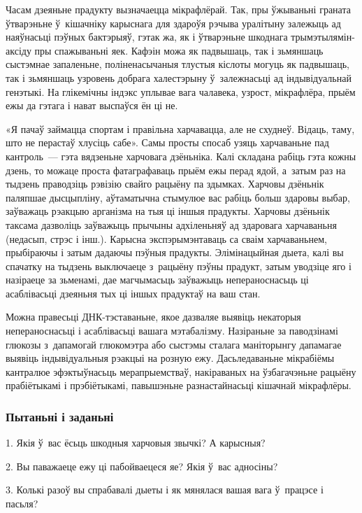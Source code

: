 Часам дзеяньне прадукту вызначаецца мікрафлёрай. Так, пры ўжываньні граната ўтварэньне ў~кішачніку карыснага для здароўя рэчыва уралітыну залежыць ад наяўнасьці пэўных бактэрыяў, гэтак жа, як і ўтварэньне шкоднага трымэтылямін-аксіду пры спажываньні яек. Кафэін можа як падвышаць, так і зьмяншаць сыстэмнае запаленьне, поліненасычаныя тлустыя кіслоты могуць як падвышаць, так і зьмяншаць узровень добрага халестэрыну ў~залежнасьці ад індывідуальнай генэтыкі. На глікемічны індэкс уплывае вага чалавека, узрост, мікрафлёра, прыём ежы да гэтага і нават выспаўся ён ці не.

«Я пачаў займацца спортам і правільна харчавацца, але не схуднеў. Відаць, таму, што не перастаў хлусіць сабе». Самы просты спосаб узяць харчаваньне пад кантроль~--- гэта вядзеньне харчовага дзёньніка. Калі складана рабіць гэта кожны дзень, то можаце проста фатаграфаваць прыём ежы перад ядой, а~затым раз на тыдзень праводзіць рэвізію свайго рацыёну па здымках. Харчовы дзёньнік паляпшае дысцыпліну, аўтаматычна стымулюе вас рабіць больш здаровы выбар, заўважаць рэакцыю арганізма на тыя ці іншыя прадукты. Харчовы дзёньнік таксама дазволіць заўважыць прычыны адхіленьняў ад здаровага харчаваньня (недасып, стрэс і інш.). Карысна экспэрымэнтаваць са сваім харчаваньнем, прыбіраючы і затым дадаючы пэўныя прадукты. Элімінацыйная дыета, калі вы спачатку на тыдзень выключаеце з~рацыёну пэўны прадукт, затым уводзіце яго і назіраеце за зьменамі, дае магчымасьць заўважыць непераноснасьць ці асаблівасьці дзеяньня тых ці іншых прадуктаў на ваш стан.

Можна правесьці ДНК-тэставаньне, якое дазваляе выявіць некаторыя непераноснасьці і асаблівасьці вашага мэтабалізму. Назіраньне за паводзінамі глюкозы з~дапамогай глюкомэтра або сыстэмы сталага маніторынгу дапамагае выявіць індывідуальныя рэакцыі на розную ежу. Дасьледаваньне мікрабіёмы кантралюе эфэктыўнасьць мерапрыемстваў, накіраваных на ўзбагачэньне рацыёну прабіётыкамі і прэбіётыкамі, павышэньне разнастайнасьці кішачнай мікрафлёры.

\subsubsection{Пытаньні і заданьні}

1. Якія ў~вас ёсьць шкодныя харчовыя звычкі? А карысныя?

2. Вы паважаеце ежу ці пабойваецеся яе? Якія ў~вас адносіны?

3. Колькі разоў вы спрабавалі дыеты і як мянялася вашая вага ў~працэсе і пасьля?


